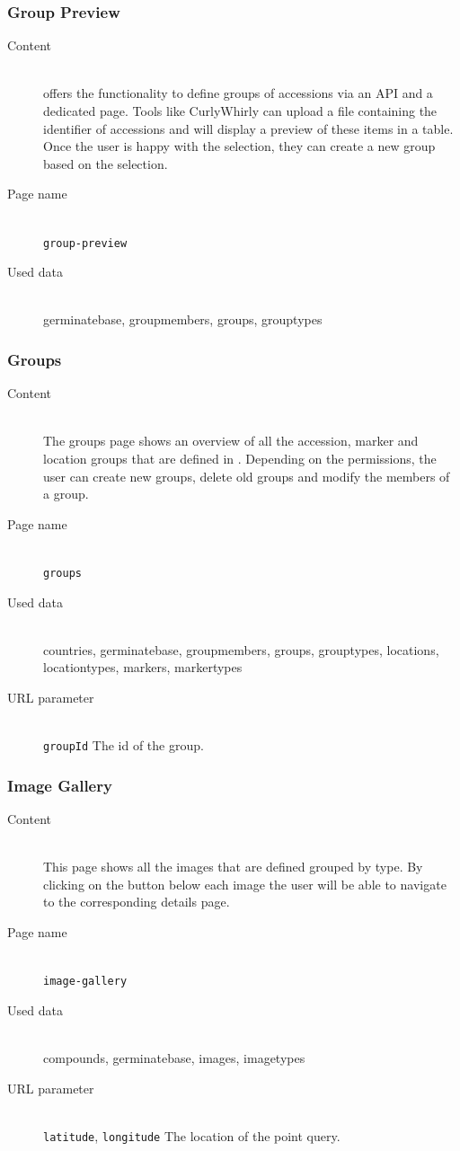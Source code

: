 \subsubsection{Group Preview}
\begin{description}
	\item[Content]\hfill\\ {\germinate} offers the functionality to define groups of accessions via an API and a dedicated page. Tools like CurlyWhirly can upload a file containing the identifier of accessions and {\germinate} will display a preview of these items in a table. Once the user is happy with the selection, they can create a new group based on the selection.
	\item[Page name]\hfill\\\texttt{group-preview}
	\item[Used data]\hfill\\germinatebase, groupmembers, groups, grouptypes
\end{description}

\subsubsection{Groups}
\begin{description}
	\item[Content]\hfill\\The groups page shows an overview of all the accession, marker and location groups that are defined in {\germinate}. Depending on the permissions, the user can create new groups, delete old groups and modify the members of a group.
	\item[Page name]\hfill\\\texttt{groups}
	\item[Used data]\hfill\\countries, germinatebase, groupmembers, groups, grouptypes, locations, locationtypes, markers, markertypes
	\item[URL parameter]\hfill\\\texttt{groupId} The id of the group.
\end{description}

\subsubsection{Image Gallery}
\begin{description}
	\item[Content]\hfill\\This page shows all the images that are defined grouped by type. By clicking on the button below each image the user will be able to navigate to the corresponding details page.
	\item[Page name]\hfil\\\texttt{image-gallery}
	\item[Used data]\hfill\\compounds, germinatebase, images, imagetypes
	\item[URL parameter]\hfill\\\texttt{latitude}, \texttt{longitude} The location of the point query.
\end{description}

